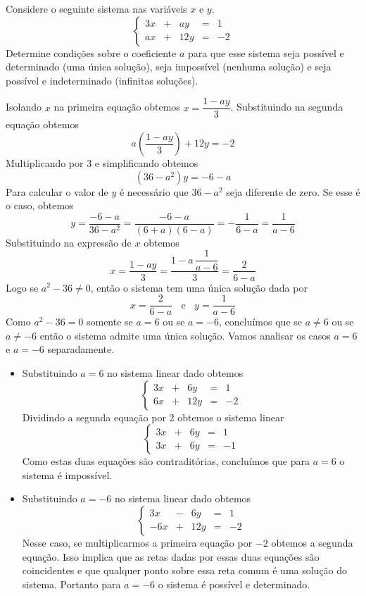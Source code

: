 \begin{problem}
Considere o seguinte sistema nas variáveis $x$ e $y$.
$$\left\{ \begin{array}{rrrrr}
3x & + &  ay &  = &   1 \\
ax & + & 12y &  = &  -2 \end{array} \right.$$
Determine condições sobre o coeficiente $a$ para que esse sistema seja possível e determinado (uma única solução), seja impossível (nenhuma solução) e seja possível e indeterminado (infinitas soluções).
\end{problem}
\begin{solution}
Isolando $x$ na primeira equação obtemos $x=\dfrac{1-ay}{3}$. Substituindo na segunda equação obtemos
$$a \left( \dfrac{1-ay}{3} \right) + 12y = -2$$
Multiplicando por 3 e simplificando obtemos
$$(36-a^2)y = -6-a$$
Para calcular o valor de $y$ é necessário que $36-a^2$ seja diferente de zero. Se esse é o caso, obtemos
$$y = \dfrac{-6-a}{36-a^2} = \dfrac{-6-a}{(6+a)(6-a)} = -\dfrac{1}{6-a} = \dfrac{1}{a-6}$$
Substituindo na expressão de $x$ obtemos 
$$x = \dfrac{1-ay}{3}  = \dfrac{1 - a \, \dfrac{1}{a-6} }{3} = \dfrac{2}{6-a}$$
Logo se $a^2-36 \neq 0$, então o sistema tem uma única solução dada por
$$x = \dfrac{2}{6-a} \ \ \ \ \text{e} \ \ \ \ y = \dfrac{1}{a-6}$$
Como $a^2-36=0$ somente se $a=6$ ou se $a=-6$, concluímos que se $a \neq 6$ ou se $a \neq-6$ então o sistema admite uma única solução.
Vamos  analisar os casos $a=6$ e $a=-6$ separadamente.

\medskip

\begin{itemize}
\item Substituindo $a=6$ no sistema linear dado obtemos
$$\left\{ \begin{array}{rrrrr}
3x & + &  6y &  = &   1 \\
6x & + & 12y &  = &  -2 \end{array} \right.$$
Dividindo a segunda equação por 2 obtemos o sistema linear
$$\left\{ \begin{array}{rrrrr}
3x & + &  6y &  = &   1 \\
3x & + &  6y &  = &  -1 \end{array} \right.$$
Como estas duas equações são contraditórias, concluímos que para $a=6$ o sistema é impossível.


\item Substituindo $a=-6$ no sistema linear dado obtemos
$$\left\{ \begin{array}{rrrrr}
 3x & - &  6y &  = &   1 \\
-6x & + & 12y &  = &  -2 \end{array} \right.$$
Nesse caso, se multiplicarmos a primeira equação por $-2$ obtemos a segunda equação. Isso implica que as retas dadas por essas duas equações são coincidentes e que qualquer ponto sobre essa reta comum é uma solução do sistema. Portanto para $a=-6$ o sistema é possível e determinado.
\end{itemize}


\end{solution}
